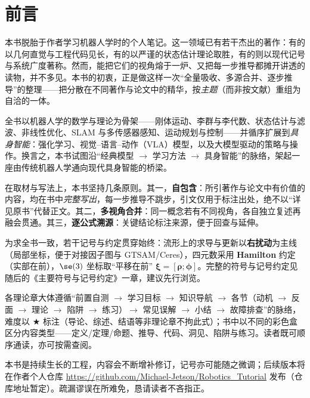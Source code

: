 \chapter*{前言}

本书脱胎于作者学习机器人学时的个人笔记。这一领域已有若干杰出的著作：有的以几何直觉与工程代码见长，有的以严谨的状态估计理论取胜，有的则以现代记号与系统广度著称。然而，能把它们的视角熔于一炉、又把每一步推导都摊开讲透的读物，并不多见。本书的初衷，正是做这样一次“全量吸收、多源合并、逐步推导”的整理——把分散在不同著作与论文中的精华，按\emph{主题}（而非按文献）重组为自洽的一体。

全书以机器人学的数学与理论为骨架——刚体运动、李群与李代数、状态估计与滤波、非线性优化、SLAM 与多传感器感知、运动规划与控制——并循序扩展到\emph{具身智能}：强化学习、视觉–语言–动作（VLA）模型，以及大模型驱动的策略与操作。换言之，本书试图沿“经典模型 $\to$ 学习方法 $\to$ 具身智能”的脉络，架起一座由传统机器人学通向现代具身智能的桥梁。

在取材与写法上，本书坚持几条原则。其一，\textbf{自包含}：所引著作与论文中有价值的内容，均在书中\emph{完整写出}，每一步推导不跳步，引文仅用于标注出处，绝不以“详见原书”代替正文。其二，\textbf{多视角合并}：同一概念若有不同视角，各自独立复述再融会贯通。其三，\textbf{逐公式溯源}：关键结论标注来源，便于回查与延伸。

为求全书一致，若干记号与约定贯穿始终：流形上的求导与更新以\textbf{右扰动}为主线（局部坐标，便于对接因子图与 GTSAM/Ceres），四元数采用 \textbf{Hamilton} 约定（实部在前），$\se(3)$ 坐标取“平移在前” $\boldsymbol{\xi}=[\boldsymbol{\rho};\boldsymbol{\phi}]$。完整的符号与记号约定见随后的《主要符号与记号约定》一章，建议先行浏览。

各理论章大体遵循“前置自测 $\to$ 学习目标 $\to$ 知识导航 $\to$ 各节（动机 $\to$ 反面 $\to$ 理论 $\to$ 陷阱 $\to$ 练习）$\to$ 常见误解 $\to$ 小结 $\to$ 故障排查”的脉络，难度以 $\bigstar$ 标注（导论、综述、结语等非理论章不拘此式）；书中以不同的彩色盒区分内容类型——定义/定理/命题、推导、代码、洞见、陷阱与练习。读者既可顺序通读，亦可按需查阅。

本书是持续生长的工程，内容会不断增补修订，记号亦可能随之微调；后续版本将在作者个人仓库 \url{https://github.com/Michael-Jetson/Robotics_Tutorial} 发布（仓库地址暂定）。疏漏谬误在所难免，恳请读者不吝指正。

